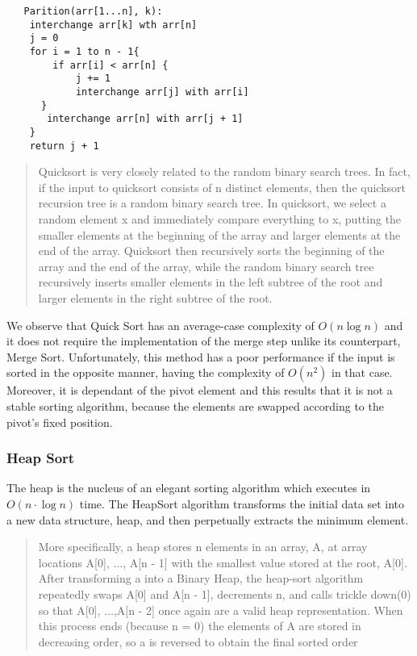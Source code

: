 \documentclass[11pt, letter paper]{article}
\begin{document}
        \begin{lstlisting}
   Parition(arr[1...n], k):
	interchange arr[k] wth arr[n]
	j = 0
	for i = 1 to n - 1{
		if arr[i] < arr[n] {
			j += 1	
			interchange arr[j] with arr[i]
      }    
	   interchange arr[n] with arr[j + 1]
    }
	return j + 1
        \end{lstlisting}

        \begin{quote}
            \cite{Morin} Quicksort is very closely related to the random binary search trees. In fact, if the input to quicksort consists of n distinct elements, then the quicksort recursion tree is a random binary search tree. 
            In quicksort, we select a random element x and immediately compare everything to x, putting the smaller elements at the beginning of the array and larger elements at the end of the array. Quicksort then recursively sorts the beginning of the array and the end of the array, while the random binary search tree recursively inserts smaller elements in the left subtree of the root and larger elements in the right subtree of the root.
        \end{quote}

        We observe that Quick Sort has an average-case complexity of $O(n \log n)$ and it does not require the implementation of the merge step unlike its counterpart, Merge Sort. Unfortunately, this method has a poor performance if the input is sorted in the opposite manner, having the complexity of $O(n ^ 2)$ in that case. Moreover, it is dependant of the pivot element and this results that it is not a stable sorting algorithm, because the elements are swapped according to the pivot's fixed position.
        
        \subsubsection{Heap Sort}
        The heap is the nucleus of an elegant sorting algorithm which executes in $O(n \cdot \log n)$ time. The HeapSort algorithm transforms the initial data set into a new data structure, heap, and then perpetually extracts the minimum element.

        \begin{quote}
           \cite{Morin} More specifically, a heap stores n elements in an array, A, at array locations A[0], $\dotsc$, A[n - 1] with the smallest value stored at the root, A[0]. After transforming a into a Binary Heap, the heap-sort algorithm repeatedly swaps A[0] and A[n - 1], decrements n, and calls trickle down(0) so that A[0], $\dotsc$,A[n - 2] once again are a valid heap representation. When this process ends (because n = 0) the elements of A are stored in decreasing order, so a is reversed to obtain the final sorted order
        \end{quote}
\end{document}
